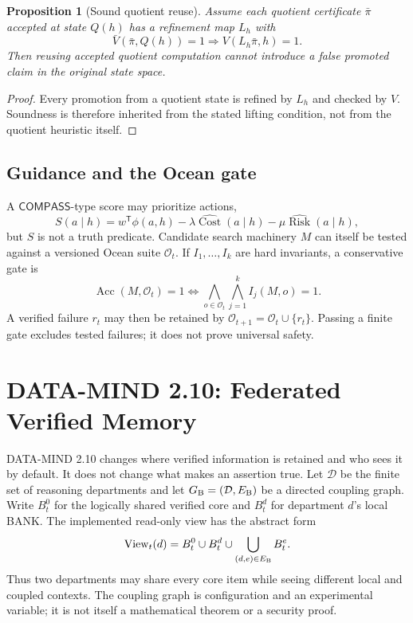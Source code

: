 \documentclass[11pt,oneside]{book}
\newtheorem{proposition}[theorem]{Proposition}
\theoremstyle{definition}
\theoremstyle{remark}
\newcommand{\COMPASS}{\mathsf{COMPASS}}
\newcommand{\OCEAN}{\mathcal O}
\newcommand{\Acc}{\operatorname{Acc}}
\newcommand{\Cost}{\operatorname{Cost}}
\newcommand{\Risk}{\operatorname{Risk}}
\newcommand{\View}{\operatorname{View}}
\begin{document}
\begin{proposition}[Sound quotient reuse]
\label{prop:quotient-reuse}
Assume each quotient certificate \(\bar\pi\) accepted at state \(Q(h)\) has a refinement map
\(L_h\) with
\[
\bar V(\bar\pi,Q(h))=1\Longrightarrow V(L_h\bar\pi,h)=1.
\]
Then reusing accepted quotient computation cannot introduce a false promoted claim in the original
state space.
\end{proposition}

\begin{proof}
Every promotion from a quotient state is refined by \(L_h\) and checked by \(V\). Soundness is
therefore inherited from the stated lifting condition, not from the quotient heuristic itself.
\end{proof}

\section{Guidance and the Ocean gate}
A \(\COMPASS\)-type score may prioritize actions,
\[
S(a\mid h)=w^{\mathsf T}\phi(a,h)-\lambda\widehat{\Cost}(a\mid h)
-\mu\widehat{\Risk}(a\mid h),
\]
but \(S\) is not a truth predicate. Candidate search machinery \(M\) can itself be tested against a
versioned Ocean suite \(\OCEAN_t\). If \(I_1,\ldots,I_k\) are hard invariants, a conservative gate is
\[
\Acc(M,\OCEAN_t)=1
\iff
\bigwedge_{o\in\OCEAN_t}\bigwedge_{j=1}^{k}I_j(M,o)=1.
\]
A verified failure \(r_t\) may then be retained by \(\OCEAN_{t+1}=\OCEAN_t\cup\{r_t\}\).
Passing a finite gate excludes tested failures; it does not prove universal safety.

\chapter{DATA-MIND 2.10: Federated Verified Memory}
\label{ch:federation}

DATA-MIND 2.10 changes where verified information is retained and who sees it by default. It does
not change what makes an assertion true. Let \(\mathcal D\) be the finite set of reasoning
departments and let \(G_{\rm B}=(\mathcal D,E_{\rm B})\) be a directed coupling graph. Write
\(B_t^0\) for the logically shared verified core and \(B_t^d\) for department \(d\)'s local BANK.
The implemented read-only view has the abstract form
\[
\View_t(d)=B_t^0\cup B_t^d\cup
\bigcup_{(d,e)\in E_{\rm B}}B_t^e.
\]
Thus two departments may share every core item while seeing different local and coupled contexts.
The coupling graph is configuration and an experimental variable; it is not itself a mathematical
theorem or a security proof.
\end{document}

